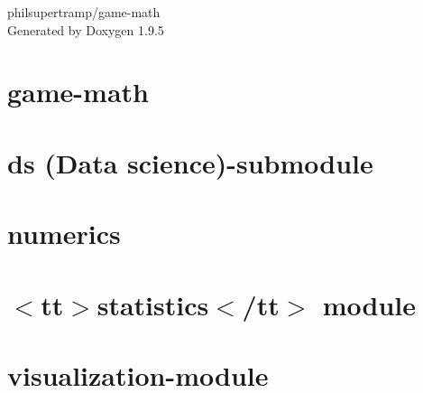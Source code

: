 \documentclass[twoside]{book}
\newcommand{\+}{\discretionary{\mbox{\scriptsize$\hookleftarrow$}}{}{}}
\newcommand{\clearemptydoublepage}{%
    \newpage{\pagestyle{empty}\cleardoublepage}%
  }
\begin{document}
  \raggedbottom
    \hypersetup{pageanchor=false,
                bookmarksnumbered=true,
                pdfencoding=unicode
               }
  \begin{titlepage}
  \vspace*{7cm}
  \begin{center}%
  {\Large philsupertramp/game-\/math}\\
  \vspace*{1cm}
  {\large Generated by Doxygen 1.9.5}\\
  \end{center}
  \end{titlepage}
  \clearemptydoublepage
  \tableofcontents
  \clearemptydoublepage
  \hypersetup{pageanchor=true}
\chapter{game-\/math}
\label{index}\hypertarget{index}{}
\chapter{ds (Data science)-\/submodule}
\label{md_include_math_ds_README}

\chapter{numerics}
\label{md_include_math_numerics_docs_README}

\chapter{\texorpdfstring{$<$}{<}tt\texorpdfstring{$>$}{>}statistics\texorpdfstring{$<$}{<}/tt\texorpdfstring{$>$}{>} module}
\label{md_include_math_statistics_README}

\chapter{visualization-\/module}
\label{md_include_math_visualization_README}

\end{document}
